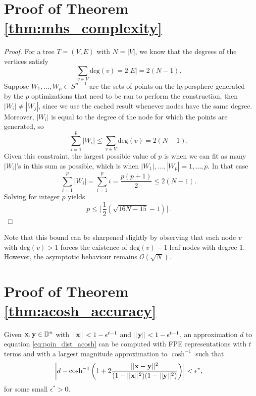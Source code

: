 \section{Proof of Theorem \ref{thm:mhs_complexity}}\label{sec:mhs_proof}
\begin{proof}
For a tree $T = (V, E)$ with $N = |V|$, we know that the degrees of the vertices satisfy
\begin{equation}
    \sum_{v \in V} \text{deg}(v) = 2 |E| = 2(N-1).
\end{equation}
Suppose $W_{1}, \ldots, W_{p} \subset S^{n-1}$ are the sets of points on the hypersphere generated by the $p$ optimizations that need to be ran to perform the construction, then $|W_{i}| \neq |W_{j}|$, since we use the cached result whenever nodes have the same degree. Moreover, $|W_i|$ is equal to the degree of the node for which the points are generated, so
\begin{equation}
    \sum_{i = 1}^p |W_i| \leq \sum_{v \in V} \text{deg}(v) = 2(N-1).
\end{equation}
Given this constraint, the largest possible value of $p$ is when we can fit as many $|W_i|$'s in this sum as possible, which is when $|W_1|, \ldots, |W_p| = 1, \ldots, p$. In that case
\begin{equation}
    \sum_{i = 1}^p |W_i| = \sum_{i=1}^p i = \frac{p(p+1)}{2} \leq 2(N-1).
\end{equation}
Solving for integer $p$ yields
\begin{equation}
    p \leq \Big\lceil \frac{1}{2} (\sqrt{16N - 15} - 1) \Big\rceil.
\end{equation}
\end{proof}
Note that this bound can be sharpened slightly by observing that each node $v$ with $\text{deg}(v) > 1$ forces the existence of $\text{deg}(v) - 1$ leaf nodes with degree 1. However, the asymptotic behaviour remains $\mathcal{O}(\sqrt{N})$.

\section{Proof of Theorem \ref{thm:acosh_accuracy}}\label{sec:acosh_accuracy_proof}
\begin{theorem*}
    Given $\mathbf{x}, \mathbf{y} \in \mathbb{D}^n$ with $||\mathbf{x}|| < 1 - \epsilon^{t - 1}$ and $||\mathbf{y}|| < 1 - \epsilon^{t - 1}$, an approximation $d$ to equation \ref{eq:poin_dist_acosh} can be computed with FPE representations with $t$ terms and with a largest magnitude approximation to $\cosh^{-1}$ such that
    \begin{equation}
        \bigg|d - \cosh^{-1} \bigg( 1 + 2 \frac{||\mathbf{x} - \mathbf{y}||^2}{(1 - ||\mathbf{x}||^2) (1 - ||\mathbf{y}||^2)} \bigg)\bigg| < \epsilon^*,
    \end{equation}
    for some small $\epsilon^* > 0$.
\end{theorem*}

